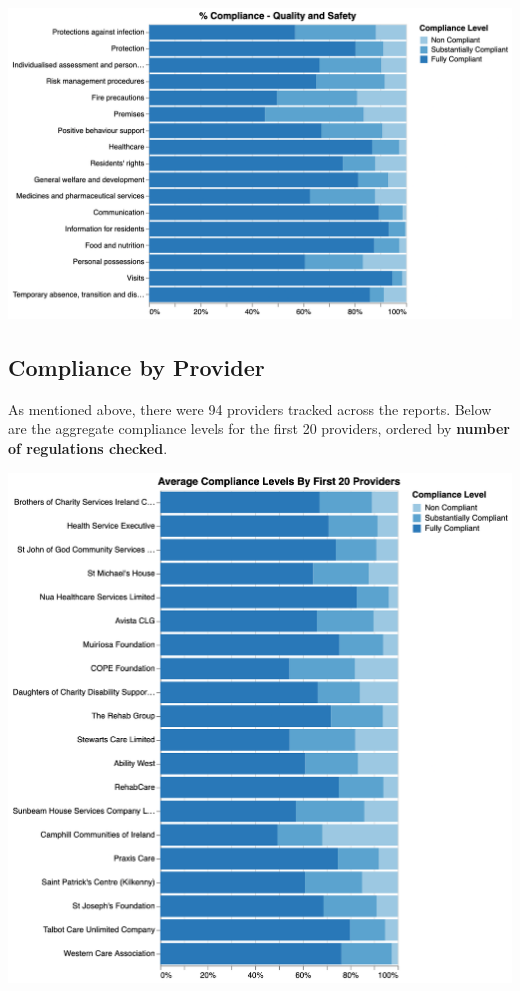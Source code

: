 \documentclass[a4paper,11pt,twoside]{article}
\begin{document}
\begin{center}
\includegraphics[width=.9\linewidth]{img/09_compliance_quality.png}
\end{center}
\subsection{Compliance by Provider}
\label{sec:org739211e}
As mentioned above, there were 94 providers tracked across the reports. Below are the aggregate compliance levels for the first 20 providers, ordered by \textbf{number of regulations checked}.

\begin{center}
\includegraphics[width=.9\linewidth]{img/10_compliance_providers.png}
\end{center}
\end{document}
